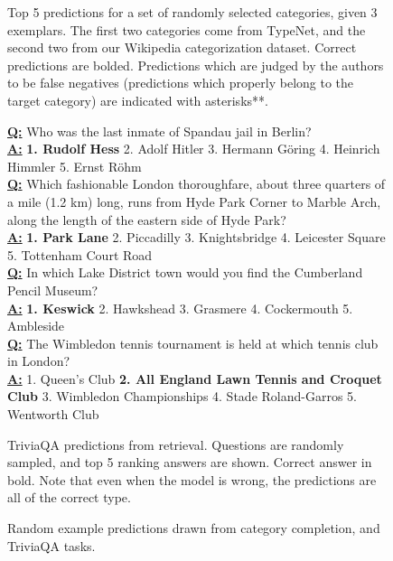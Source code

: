\documentclass{article} \usepackage{iclr2020_conference,times}
\begin{document}
\begin{figure*}[]
\begin{subtable}[b]{\textwidth}
\begin{tabular}{|p{}|p{}|p{}|}
        \hline
\bottomrule


    \end{tabular}
    \caption{Top 5 predictions for a set of randomly selected categories, given 3 exemplars. The first two categories come from TypeNet, and the second two from our Wikipedia categorization dataset. Correct predictions are bolded. Predictions which are judged by the authors to be false negatives (predictions which properly belong to the target category) are indicated with asterisks**.}
    \label{tab:category_preds}
    \end{subtable}
    
    \vspace{0.2cm}

\begin{subtable}[t]{\textwidth}
\begin{framed}
\small
        \textbf{\underline{Q:}} Who was the last inmate of Spandau jail in Berlin? \\
        \textbf{\underline{A:}} \textbf{1. Rudolf Hess} 2. Adolf Hitler 3. Hermann Göring 4. Heinrich Himmler 5. Ernst Röhm \\
       
        \textbf{\underline{Q:}} Which fashionable London thoroughfare, about three quarters of a mile (1.2 km) long, runs from Hyde Park Corner to Marble Arch, along the length of the eastern side of Hyde Park? \\
        \textbf{\underline{A:}} \textbf{1. Park Lane} 2. Piccadilly 3. Knightsbridge 4. Leicester Square 5. Tottenham Court Road \\
    
        \textbf{\underline{Q:}} In which Lake District town would you find the Cumberland Pencil Museum? \\
        \textbf{\underline{A:}} \textbf{1. Keswick} 2. Hawkshead 3. Grasmere 4. Cockermouth 5. Ambleside \\
  
        \textbf{\underline{Q:}} The Wimbledon tennis tournament is held at which tennis club in London? \\
        \textbf{\underline{A:}} 1. Queen's Club \textbf{2. All England Lawn Tennis and Croquet Club} 3. Wimbledon Championships 4. Stade Roland-Garros 5. Wentworth Club 


\end{framed}
    \caption{TriviaQA predictions from retrieval. Questions are randomly sampled, and top 5 ranking answers are shown. Correct answer in bold. Note that even when the model is wrong, the predictions are all of the correct type.}
    \label{tab:triviaqa_preds}
    \end{subtable}
    
    \caption{Random example predictions drawn from category completion, and TriviaQA tasks.}

\end{figure*} 
\end{document}

